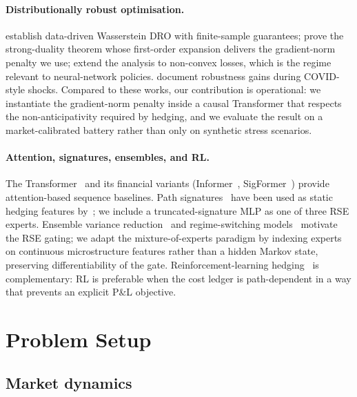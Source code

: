 \documentclass[10pt,letterpaper]{article}
\begin{document}
\paragraph{Distributionally robust optimisation.}
\citet{esfahani2018data} establish data-driven Wasserstein DRO with
finite-sample guarantees; \citet{blanchet2019quantifying} prove the
strong-duality theorem whose first-order expansion delivers the
gradient-norm penalty we use; \citet{gao2023distributionally} extend
the analysis to non-convex losses, which is the regime relevant to
neural-network policies. \citet{lutkebohmert2019robust} document
robustness gains during COVID-style shocks. Compared to these
works, our contribution is operational: we instantiate the
gradient-norm penalty inside a causal Transformer that respects
the non-anticipativity required by hedging, and we evaluate the
result on a market-calibrated battery rather than only on
synthetic stress scenarios.

\paragraph{Attention, signatures, ensembles, and RL.}
The Transformer~\citep{vaswani2017attention} and its financial
variants (Informer~\citep{zhou2021informer},
SigFormer~\citep{tong2023sigformer}) provide attention-based
sequence baselines. Path
signatures~\citep{lyons1998differential,kidger2020signatory} have
been used as static hedging features
by~\citet{cuchiero2020deep,abijaber2023hedging}; we include a
truncated-signature MLP as one of three RSE experts. Ensemble
variance reduction~\citep{dietterich2000ensemble} and
regime-switching models~\citep{hamilton1989new} motivate the RSE
gating; we adapt the mixture-of-experts paradigm by indexing
experts on continuous microstructure features rather than a
hidden Markov state, preserving differentiability of the gate.
Reinforcement-learning hedging~\citep{kolm2019dynamic,cao2021deep,neagu2025drl,huang2025sac}
is complementary: RL is preferable when the cost ledger is
path-dependent in a way that prevents an explicit P\&L objective.

\section{Problem Setup}\label{sec:setup}

\subsection{Market dynamics}
\end{document}
